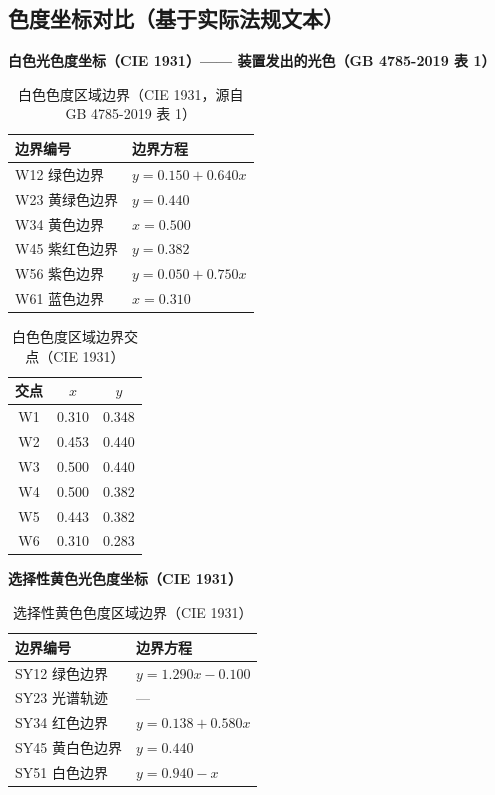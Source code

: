 \subsection{色度坐标对比（基于实际法规文本）}

\textbf{白色光色度坐标（CIE 1931）—— 装置发出的光色（GB 4785-2019 表 1）}

\begin{table}[H]
\centering
\caption{白色色度区域边界（CIE 1931，源自 GB 4785-2019 表 1）}
\begin{tabular}{|l|l|}
\hline
\textbf{边界编号} & \textbf{边界方程} \\
\hline
W12 绿色边界  & $y = 0.150 + 0.640x$ \\
\hline
W23 黄绿色边界 & $y = 0.440$ \\
\hline
W34 黄色边界  & $x = 0.500$ \\
\hline
W45 紫红色边界 & $y = 0.382$ \\
\hline
W56 紫色边界  & $y = 0.050 + 0.750x$ \\
\hline
W61 蓝色边界  & $x = 0.310$ \\
\hline
\end{tabular}
\end{table}

\begin{table}[H]
\centering
\caption{白色色度区域边界交点（CIE 1931）}
\begin{tabular}{|c|c|c|}
\hline
\textbf{交点} & \textbf{$x$} & \textbf{$y$} \\
\hline
W1 & 0.310 & 0.348 \\
\hline
W2 & 0.453 & 0.440 \\
\hline
W3 & 0.500 & 0.440 \\
\hline
W4 & 0.500 & 0.382 \\
\hline
W5 & 0.443 & 0.382 \\
\hline
W6 & 0.310 & 0.283 \\
\hline
\end{tabular}
\end{table}

\textbf{选择性黄色光色度坐标（CIE 1931）}

\begin{table}[H]
\centering
\caption{选择性黄色色度区域边界（CIE 1931）}
\begin{tabular}{|l|l|}
\hline
\textbf{边界编号} & \textbf{边界方程} \\
\hline
SY12 绿色边界  & $y = 1.290x - 0.100$ \\
\hline
SY23 光谱轨迹   & --- \\
\hline
SY34 红色边界  & $y = 0.138 + 0.580x$ \\
\hline
SY45 黄白色边界 & $y = 0.440$ \\
\hline
SY51 白色边界  & $y = 0.940 - x$ \\
\hline
\end{tabular}
\end{table}

